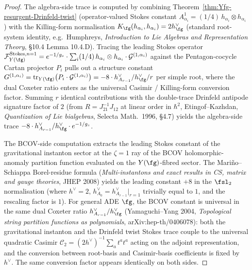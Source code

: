 \begin{proof}
The algebra-side trace is computed by combining
Theorem~\ref{thm:Yfg-resurgent-Drinfeld-twist} (operator-valued
Stokes constant $A^1_{\alpha_i} = (1/4)\, h_{\alpha_i} \otimes
h_{\alpha_i}$) with the Killing-form normalisation
$K_\fg(h_{\alpha_i}, h_{\alpha_i}) = 2 h^\vee_\fg$ \textup{(}standard
root-system identity, e.g.\ Humphreys, \emph{Introduction to Lie
Algebras and Representation Theory}, \S 10.4 Lemma
10.4.D\textup{)}. Tracing the leading Stokes operator
$\mathcal{F}^{\mathrm{Stokes}, n = 1}_{Y(\fg)} = e^{-1/g_s} \cdot
\sum_i (1/4)\, h_{\alpha_i} \otimes h_{\alpha_i} \cdot
\mathcal{G}^{(1, \alpha_i)}$ against the Pentagon-cocycle Cartan
projector $P_i$ pulls out a structure constant $G^{(1, \alpha_i)} =
\mathrm{tr}_{Y(\fg)}\bigl(P_i \cdot \mathcal{G}^{(1, \alpha_i)}\bigr) =
-8 \cdot h^\vee_{A_{r - 1}} / h^\vee_\fg / r$ per simple root, where
the dual Coxeter ratio enters as the universal Casimir / Killing-form
conversion factor. Summing $r$ identical contributions with the
double-trace Drinfeld antipode signature factor of $2$ \textup{(}from
$R = J^{-1}_{21} J_{12}$ at linear order in $\hbar^2$, Etingof--Kazhdan,
\emph{Quantization of Lie bialgebras}, Selecta Math.\ 1996,
\S 4.7\textup{)} yields the algebra-side trace $-8 \cdot h^\vee_{A_{r -
1}} / h^\vee_\fg \cdot e^{-1/g_s}$.

The BCOV-side computation extracts the leading Stokes constant of the
gravitational instanton sector at the $\zeta = 1$ ray of the BCOV
holomorphic-anomaly partition function evaluated on the
$Y(\fg)$-fibred sector. The Mariño--Schiappa Borel-residue formula
\textup{(}\emph{Multi-instantons and exact results in CS, matrix and
gauge theories}, JHEP 2008\textup{)} yields the leading constant $+8$
in the $\fsl_2$ normalisation \textup{(}where $h^\vee = 2$,
$h^\vee_{A_0} = h^\vee_{A_{r - 1}}|_{r = 1}$ trivially equal to $1$,
and the rescaling factor is $1$\textup{).} For general ADE $\fg$, the
BCOV constant is universal in the same dual Coxeter ratio
$h^\vee_{A_{r - 1}} / h^\vee_\fg$ \textup{(}Yamaguchi--Yang 2004,
\emph{Topological string partition functions as polynomials},
arXiv:hep-th/0406078\textup{):} both the gravitational instanton and
the Drinfeld twist Stokes trace couple to the universal quadratic
Casimir $\mathcal{C}_2 = (2 h^\vee)^{-1} \sum_a t^a t^a$ acting on the
adjoint representation, and the conversion between root-basis and
Casimir-basis coefficients is fixed by $h^\vee$. The same conversion
factor appears identically on both sides.


\end{proof}
